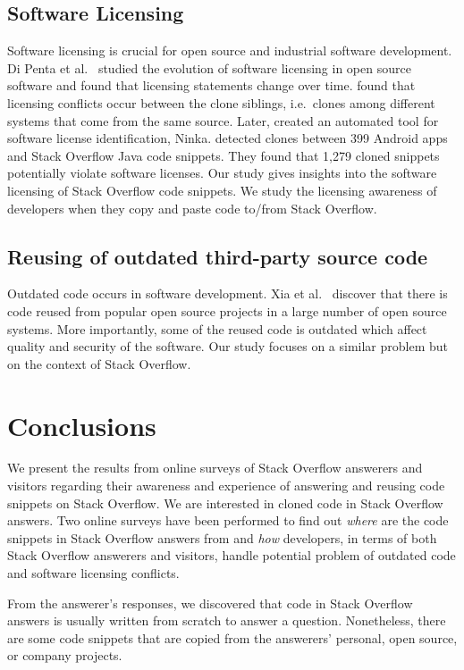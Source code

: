 \documentclass{svjour3}                     %
\begin{document}
\subsection{Software Licensing} Software licensing is crucial for open source
and industrial software development. Di Penta et al.~\cite{DiPenta2010} studied
the evolution of software licensing in open source software and found that
licensing statements change over time. \cite{German2009} found that licensing
conflicts occur between the clone siblings, i.e.~clones among different systems
that come from the same source. Later, \cite{German2010} created an automated
tool for software license identification, Ninka. \cite{An2017} detected clones
between 399 Android apps and Stack Overflow Java code snippets. They found  that
1,279 cloned snippets potentially violate software licenses. Our study gives
insights into the software licensing of Stack Overflow code snippets. We study
the licensing awareness of developers when they copy and paste code to/from
Stack Overflow.

\subsection{Reusing of outdated third-party source code} Outdated code occurs in
software development. Xia et al.~\cite{Xia2014} discover that there is code
reused from popular open source projects in a large number of open source
systems. More importantly, some of the reused code is outdated which affect
quality and security of the software. Our study focuses on a similar problem but
on the context of Stack Overflow.

\section{Conclusions}

We present the results from online surveys of Stack Overflow answerers and
visitors regarding their awareness and experience of answering and reusing code
snippets on Stack Overflow. We are interested in cloned code in Stack Overflow
answers. Two online surveys have been performed to find out \textit{where} are
the code snippets in Stack Overflow answers from and \textit{how} developers, in
terms of both Stack Overflow answerers and visitors, handle potential problem of
outdated code and software licensing conflicts.

From the answerer's responses, we discovered that code in Stack Overflow answers
is usually written from scratch to answer a question. Nonetheless, there are
some code snippets that are copied from the answerers' personal, open source, or
company projects.
\end{document}
